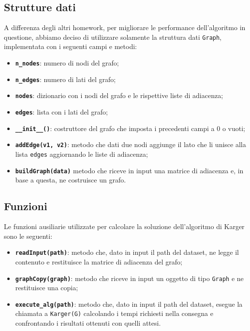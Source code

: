 \subsection{Strutture dati}

	A differenza degli altri homework, per migliorare le performance dell'algoritmo in questione, abbiamo deciso di utilizzare solamente la struttura dati \texttt{Graph}, implementata con i seguenti campi e metodi:
	\begin{itemize}
		\item \texttt{\textbf{n\_nodes}}: numero di nodi del grafo;
		\item \texttt{\textbf{n\_edges}}: numero di lati del grafo;
		\item \texttt{\textbf{nodes}}: dizionario con i nodi del grafo e le rispettive liste di adiacenza;
		\item \texttt{\textbf{edges}}: lista con i lati del grafo;
		\item \texttt{\textbf{\_\_init\_\_()}}: costruttore del grafo che imposta i precedenti campi a 0 o vuoti;
		\item \texttt{\textbf{addEdge(v1, v2)}}: metodo che dati due nodi aggiunge il lato che li unisce alla lista \texttt{edges} aggiornando le liste di adiacenza;
		\item \texttt{\textbf{buildGraph(data)}} metodo che riceve in input una matrice di adiacenza e, in base a questa, ne costruisce un grafo.
	\end{itemize}
	
\subsection{Funzioni}
	
	Le funzioni ausiliarie utilizzate per calcolare la soluzione dell'algoritmo di Karger sono le seguenti:
	\begin{itemize}
		\item \texttt{\textbf{readInput(path)}}: metodo che, dato in input il path del dataset, ne legge il contenuto e restituisce la matrice di adiacenza del grafo;
		\item \texttt{\textbf{graphCopy(graph)}}: metodo che riceve in input un oggetto di tipo \texttt{Graph} e ne restituisce una copia;
		\item \texttt{\textbf{execute\_alg(path)}}: metodo che, dato in input il path del dataset, esegue la chiamata a \texttt{Karger(G)} calcolando i tempi richiesti nella consegna e confrontando i risultati ottenuti con quelli attesi.
	\end{itemize}

